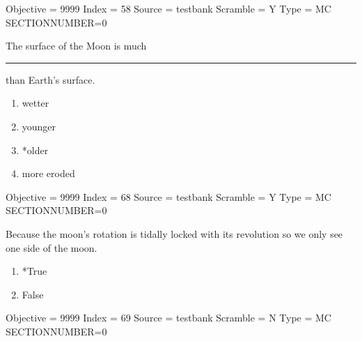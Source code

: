 \documentclass[11pt]{article}
\begin{document}
\begin{enumerate}
\begin{minipage}{\textwidth}
\begin{minipage}{\textwidth}
Objective = 9999
Index = 58
Source = testbank
Scramble = Y
Type = MC
SECTIONNUMBER=0
\end{minipage}
\end{minipage}
\vskip 0.20in

\begin{minipage}{\textwidth}
\begin{minipage}{\textwidth}
\item The surface of the Moon is much \rule{10mm}{0.4pt}  than Earth's surface.
\begin{multicols}{3}
\begin{enumerate} 
\setlength{\itemsep}{1pt} 
\setlength{\parskip}{0pt} 
\setlength{\parsep}{0pt}
\setlength{\multicolsep}{1pt} 
\item wetter
\item younger
\item *older
\item more eroded
\end{enumerate} 
\vfill 
\end{multicols}

Objective = 9999
Index = 68
Source = testbank
Scramble = Y
Type = MC
SECTIONNUMBER=0
\end{minipage}
\end{minipage}
\vskip 0.20in

\begin{minipage}{\textwidth}
\begin{minipage}{\textwidth}
\item Because the moon's rotation is tidally locked with its revolution so we only see one side of the moon.
\begin{multicols}{3}
\begin{enumerate} 
\setlength{\itemsep}{1pt} 
\setlength{\parskip}{0pt} 
\setlength{\parsep}{0pt}
\setlength{\multicolsep}{1pt} 
\item *True
\item False
\end{enumerate} 
\vfill 
\end{multicols}

Objective = 9999
Index = 69
Source = testbank
Scramble = N
Type = MC
SECTIONNUMBER=0
\end{minipage}
\end{minipage}
\vskip 0.20in


\end{enumerate}
\end{document}
